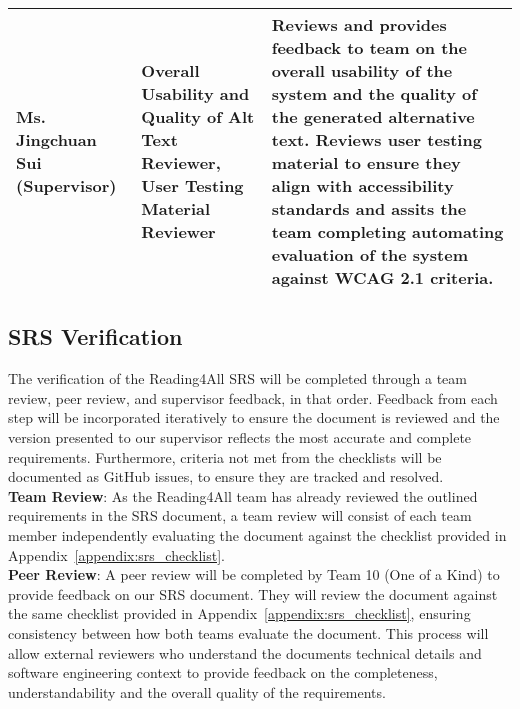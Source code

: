 \documentclass[12pt, titlepage]{article}
\begin{document}
\begin{table}[H]
\begin{tabular}{ |p{3.0cm}|p{3.8cm}|p{7.3cm}| }
      \hline
      Ms. Jingchuan Sui (Supervisor) & Overall Usability and Quality of Alt Text Reviewer, User Testing Material Reviewer& Reviews and provides feedback to team on the overall usability of the system and the quality of the generated alternative text. Reviews user testing material to ensure they align with accessibility standards and assits the team completing automating evaluation of the system against WCAG 2.1 criteria. \\ 
      \hline
    \end{tabular}
  \end{table}
  
  
\subsection{SRS Verification}



The verification of the Reading4All SRS will be completed
 through a team review, peer review, and supervisor feedback, in that order. 
 Feedback from each step will be incorporated iteratively to ensure the document is reviewed and the version presented to our supervisor reflects the most accurate and complete requirements.
 Furthermore, criteria not met from the checklists will be documented as GitHub issues, to ensure they are tracked and resolved. 
  \\

\textbf{Team Review}:
As the Reading4All team has already reviewed the outlined requirements in the SRS document, a team review will 
consist of each team member independently evaluating the document against the checklist provided in Appendix~\ref{appendix:srs_checklist}.   \\

\textbf{Peer Review}:
A peer review will be completed by Team 10 (One of a Kind) to provide feedback on our SRS document.
They will review the document against the same checklist provided in Appendix~\ref{appendix:srs_checklist}, ensuring consistency between how both teams evaluate the document. 
This process will allow external reviewers who understand the documents technical details and software engineering context to provide feedback on the completeness, understandability and the overall quality of the requirements. \\
\end{document}
